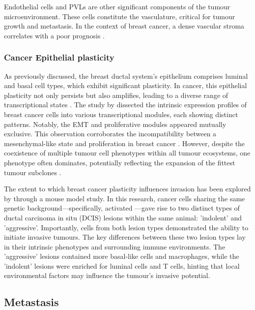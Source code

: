 Endothelial cells and \acp{PVL} are other significant components of the tumour microenvironment. These cells constitute the vasculature, critical for tumour growth and metastasis. In the context of breast cancer, a dense vascular stroma correlates with a poor prognosis \parencite{Danenberg2022-zb}.

\subsubsection*{Cancer Epithelial plasticity}

As previously discussed, the breast ductal system's epithelium comprises luminal and basal cell types, which exhibit significant plasticity. In cancer, this epithelial plasticity not only persists but also amplifies, leading to a diverse range of transcriptional states \parencite{Wagner2019-zp, Wu2021-uq, Pal2021-rf}. The study by \textcite{Wu2021-uq} dissected the intrinsic expression profiles of breast cancer cells into various transcriptional modules, each showing distinct patterns. Notably, the \acf{EMT} and proliferative modules appeared mutually exclusive. This observation corroborates the incompatibility between a mesenchymal-like state and proliferation in breast cancer \parencite{Tsai2012-hb}. However, despite the coexistence of multiple tumour cell phenotypes within all tumour ecosystems, one phenotype often dominates, potentially reflecting the expansion of the fittest tumour subclones \parencite{Wagner2019-zp}.

The extent to which breast cancer plasticity influences invasion has been explored by \textcite{Sinha2021-mf} through a mouse model study. In this research, cancer cells sharing the same genetic background—specifically, activated —gave rise to two distinct types of ductal carcinoma in situ (DCIS) lesions within the same animal: 'indolent' and 'aggressive'. Importantly, cells from both lesion types demonstrated the ability to initiate invasive tumours. The key differences between these two lesion types lay in their intrinsic phenotypes and surrounding immune environments. The 'aggressive' lesions contained more basal-like cells and macrophages, while the 'indolent' lesions were enriched for luminal cells and T cells, hinting that local environmental factors may influence the tumour's invasive potential.

\subsection{Metastasis}

